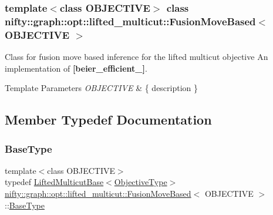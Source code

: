 \subsubsection*{template$<$class O\+B\+J\+E\+C\+T\+I\+VE$>$\newline
class nifty\+::graph\+::opt\+::lifted\+\_\+multicut\+::\+Fusion\+Move\+Based$<$ O\+B\+J\+E\+C\+T\+I\+V\+E $>$}

Class for fusion move based inference for the lifted multicut objective An implementation of {\bfseries [beier\+\_\+efficient\+\_]}. 


\begin{DoxyTemplParams}{Template Parameters}
{\em O\+B\+J\+E\+C\+T\+I\+VE} & \{ description \} \\
\hline
\end{DoxyTemplParams}


\subsection{Member Typedef Documentation}
\mbox{\label{classnifty_1_1graph_1_1opt_1_1lifted__multicut_1_1FusionMoveBased_a2295af0bf362a9101ca4195489ca5624}} 
\subsubsection{\texorpdfstring{Base\+Type}{BaseType}}
{\footnotesize\ttfamily template$<$class O\+B\+J\+E\+C\+T\+I\+VE$>$ \\
typedef \hyperlink{classnifty_1_1graph_1_1opt_1_1lifted__multicut_1_1LiftedMulticutBase}{Lifted\+Multicut\+Base}$<$\hyperlink{classnifty_1_1graph_1_1opt_1_1lifted__multicut_1_1FusionMoveBased_a9cb2fb9caff3dac87f0d43cf757e676c}{Objective\+Type}$>$ \hyperlink{classnifty_1_1graph_1_1opt_1_1lifted__multicut_1_1FusionMoveBased}{nifty\+::graph\+::opt\+::lifted\+\_\+multicut\+::\+Fusion\+Move\+Based}$<$ O\+B\+J\+E\+C\+T\+I\+VE $>$\+::\hyperlink{classnifty_1_1graph_1_1opt_1_1lifted__multicut_1_1FusionMoveBased_a2295af0bf362a9101ca4195489ca5624}{Base\+Type}}

\mbox{\label{classnifty_1_1graph_1_1opt_1_1lifted__multicut_1_1FusionMoveBased_a447cad3928bd98e925a5beca919790f7}} 
